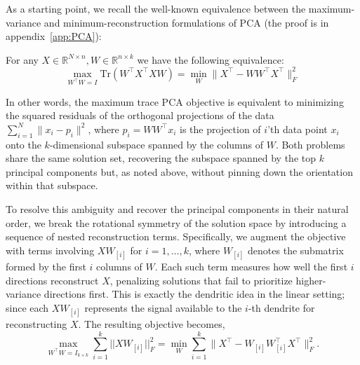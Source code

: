 \documentclass[twoside,11pt]{article}
\begin{document}
As a starting point, we recall the well-known equivalence between the maximum-variance and minimum-reconstruction formulations of PCA (the proof is in appendix~\ref{app:PCA}):
\begin{proposition}
    For any $X\in \mathbb{R}^{N\times n}, W\in \mathbb{R}^{n\times k}$ we have the following equivalence:\[\max_{W^\top W = I}  \text{Tr}(W^\top X^\top X W) = \min_W \| X^\top - W W^\top X^\top \|_F^2\]
\end{proposition}

In other words, the maximum trace PCA objective is equivalent to minimizing the squared residuals of the orthogonal projections of the data $\sum_{i=1}^N \|x_i-p_i\|^2$,  where $p_i = WW^\top x_i$ is the projection of $i$'th data point $x_i$ onto the $k$-dimensional subspace spanned by the columns of $W$. Both problems share the same solution set, recovering the subspace spanned by the top $k$ principal components but, as noted above, without pinning down the orientation within that subspace.


To resolve this ambiguity and recover the principal components in their natural order, we break the rotational symmetry of the solution space by introducing a sequence of nested reconstruction terms. Specifically, we augment the objective with terms involving $XW_{[i]}$ for $i=1, \dots, k$, where $W_{[i]}$ denotes the submatrix formed by the first $i$ columns of $W$. Each such term measures how well the first $i$ directions reconstruct $X$, penalizing solutions that fail to prioritize higher-variance directions first. This is exactly the dendritic idea in the linear setting; since each $XW_{[i]}$ represents the signal available to the $i$-th dendrite for reconstructing $X$. The resulting objective becomes,
\[\max_{W^\top W = I_{k\times k}} \sum_{i=1}^k ||X W_{[i]}||_F^2 =  \min_W \sum_{i=1}^k \|X^\top-W_{[i]}W_{[i]}^\top X^\top\|_F^2. \]
\end{document}
